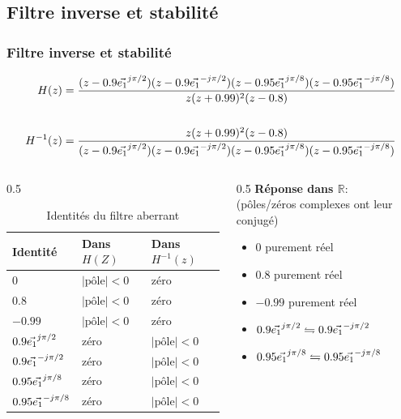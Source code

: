 \subsection{Filtre inverse et stabilité}

\begin{frame}
\frametitle{Filtre inverse et stabilité}
	\footnotesize{\begin{align}
		H(z) &= \frac{
				(z-0.9\vec{e_1}^{j\pi/2})
				(z-0.9\vec{e_1}^{-j\pi/2})
				(z-0.95\vec{e_1}^{j\pi/8})
				(z-0.95\vec{e_1}^{-j\pi/8})
		  }{
				z(z+0.99)^2(z-0.8)
			} \\ \nonumber \\
		H^{-1}(z)  &= \frac{
				z(z+0.99)^2(z-0.8)
		  }{
				(z-0.9\vec{e_1}^{j\pi/2})
				(z-0.9\vec{e_1}^{-j\pi/2})
				(z-0.95\vec{e_1}^{j\pi/8})
				(z-0.95\vec{e_1}^{-j\pi/8})
			}
	\end{align}}
	\begin{columns}
		\begin{column}{0.5\textwidth}
			\begin{table}
				\caption{Identités du filtre aberrant}
				\begin{tabular}{lll}
					\toprule
					Identité & Dans $H(Z)$ & Dans $H^{-1}(z)$ \\
					\midrule
					$0$                & $|\textrm{pôle}| <0$ & zéro \\
					$0.8$              & $|\textrm{pôle}| <0$ & zéro \\
					$-0.99$            & $|\textrm{pôle}| <0$ & zéro \\
					$0.9\vec{e_1}^{j\pi/2}$   & zéro & $|\textrm{pôle}| <0$ \\
					$0.9\vec{e_1}^{-j\pi/2}$  & zéro & $|\textrm{pôle}| <0$ \\
					$0.95\vec{e_1}^{j\pi/8}$  & zéro & $|\textrm{pôle}| <0$ \\
					$0.95\vec{e_1}^{-j\pi/8}$ & zéro & $|\textrm{pôle}| <0$ \\
					\bottomrule
				\end{tabular}
			\end{table}
		\end{column}
		\begin{column}{0.5\textwidth}
			\textbf{Réponse dans $\mathbb{R}$}: \\
			(pôles/zéros complexes ont leur conjugé) \\
			\begin{itemize}
				\item $0$ purement réel
				\item $0.8$ purement réel
				\item $-0.99$ purement réel\footnotemark[1]
				\item $0.9\vec{e_1}^{j\pi/2}\leftrightharpoons0.9\vec{e_1}^{-j\pi/2}$
				\item $0.95\vec{e_1}^{j\pi/8}\leftrightharpoons0.95\vec{e_1}^{-j\pi/8}$
			\end{itemize}
		\end{column}
	\end{columns}
\end{frame}


